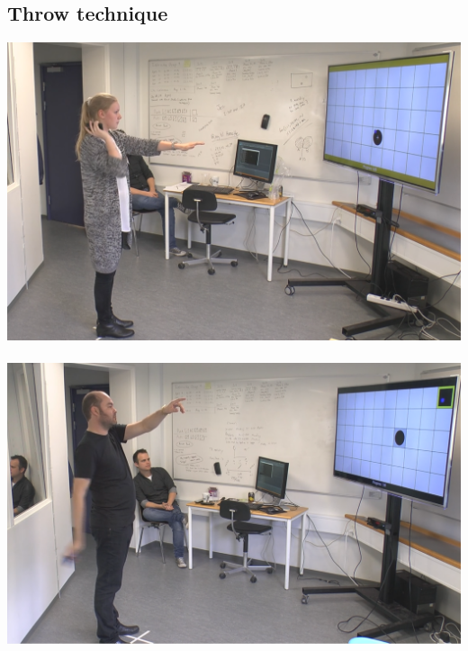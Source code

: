 \subsection*{Throw technique}
\includegraphics[width=\textwidth]{docs/appendix/files/throw_push.png}
\\\\
\includegraphics[width=\textwidth]{docs/appendix/files/throw_pull.png}

